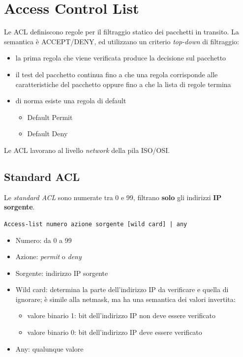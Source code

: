 \section{Access Control List}
Le ACL definiscono regole per il filtraggio statico dei pacchetti in transito. La semantica 
è ACCEPT/DENY, ed utilizzano un criterio \textit{top-down} di filtraggio:
\begin{itemize}
    \item la prima regola che viene verificata produce la decisione sul pacchetto
    \item il test del pacchetto continua fino a che una regola corrisponde alle caratteristiche 
    del pacchetto oppure fino a che la lista di regole termina 
    \item di norma esiste una regola di default
    \begin{itemize}
        \item Default Permit 
        \item Default Deny 
    \end{itemize}
\end{itemize}

\noindent Le ACL lavorano al livello \textit{network} della pila ISO/OSI.

\subsection{Standard ACL}
Le \textit{standard ACL} sono numerate tra 0 e 99, filtrano \textbf{solo} gli 
indirizzi \textbf{IP sorgente}.

\begin{center}
    \texttt{Access-list numero azione sorgente [wild card] | any}
\end{center}

\begin{itemize}
    \item Numero: da 0 a 99 
    \item Azione: \textit{permit} o \textit{deny}
    \item Sorgente: indirizzo IP sorgente 
    \item Wild card: determina la parte dell'indirizzo IP da verificare e quella di ignorare;
    è simile alla netmask, ma ha una semantica dei valori invertita:
    \begin{itemize}
        \item valore binario 1: bit dell'indirizzo IP non deve essere verificato
        \item valore binario 0: bit dell'indirizzo IP deve essere verificato 
    \end{itemize}
    \item Any: qualunque valore
\end{itemize}

